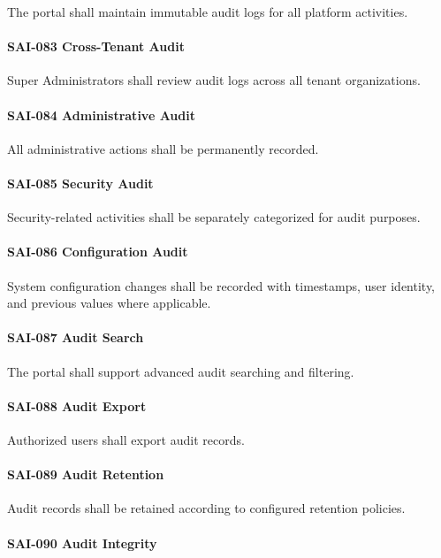 The portal shall maintain immutable audit logs for all platform
activities.

\paragraph{SAI-083 Cross-Tenant Audit}

Super Administrators shall review audit logs across all tenant
organizations.

\paragraph{SAI-084 Administrative Audit}

All administrative actions shall be permanently recorded.

\paragraph{SAI-085 Security Audit}

Security-related activities shall be separately categorized for audit
purposes.

\paragraph{SAI-086 Configuration Audit}

System configuration changes shall be recorded with timestamps, user
identity, and previous values where applicable.

\paragraph{SAI-087 Audit Search}

The portal shall support advanced audit searching and filtering.

\paragraph{SAI-088 Audit Export}

Authorized users shall export audit records.

\paragraph{SAI-089 Audit Retention}

Audit records shall be retained according to configured retention
policies.

\paragraph{SAI-090 Audit Integrity}

